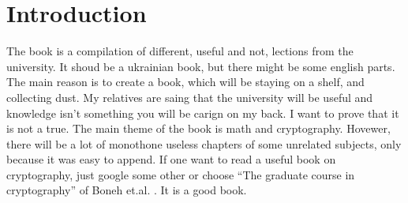 \chapter{Introduction}

The book is a compilation of different, useful and not, lections from the university. It shoud be a ukrainian book, but there might be some english parts. The main reason is to create a book, which will be staying on a shelf, and collecting dust. My relatives are saing that the university will be useful and knowledge isn't something you will be carign on my back. I want to prove that it is not a true. The main theme of the book is math and cryptography. Hovewer, there will be a lot of monothone useless chapters of some unrelated subjects, only because it was easy to append. If one want to read a useful book on cryptography, just google some other or choose ``The graduate course in cryptography'' of Boneh et.al. \cite{Boneh2015}. It is a good book.
